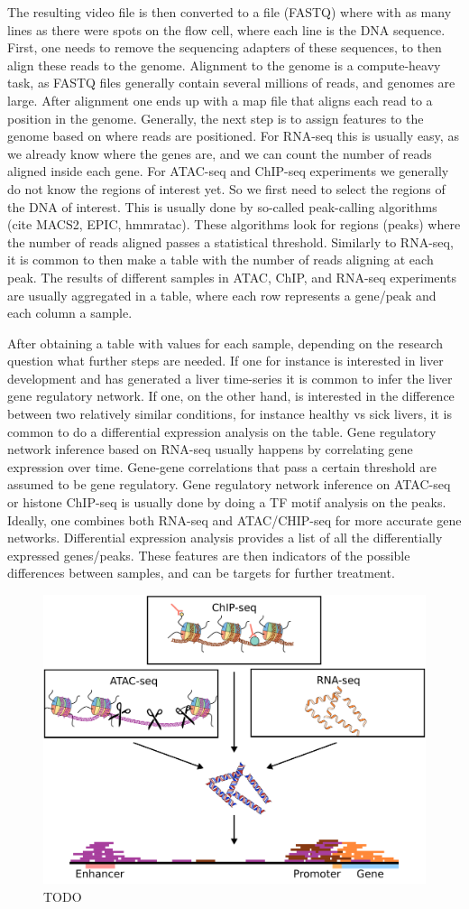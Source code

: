 The resulting video file is then converted to a file (FASTQ) where with as many lines as there were spots on the flow cell, where each line is the DNA sequence. First, one needs to remove the sequencing adapters of these sequences, to then align these reads to the genome. Alignment to the genome is a compute-heavy task, as FASTQ files generally contain several millions of reads, and genomes are large. After alignment one ends up with a map file that aligns each read to a position in the genome. Generally, the next step is to assign features to the genome based on where reads are positioned. For RNA-seq this is usually easy, as we already know where the genes are, and we can count the number of reads aligned inside each gene. For ATAC-seq and ChIP-seq experiments we generally do not know the regions of interest yet. So we first need to select the regions of the DNA of interest. This is usually done by so-called peak-calling algorithms (cite MACS2, EPIC, hmmratac). These algorithms look for regions (peaks) where the number of reads aligned passes a statistical threshold. Similarly to RNA-seq, it is common to then make a table with the number of reads aligning at each peak. The results of different samples in ATAC, ChIP, and RNA-seq experiments are usually aggregated in a table, where each row represents a gene/peak and each column a sample.

After obtaining a table with values for each sample, depending on the research question what further steps are needed. If one for instance is interested in liver development and has generated a liver time-series it is common to infer the liver gene regulatory network. If one, on the other hand, is interested in the difference between two relatively similar conditions, for instance healthy vs sick livers, it is common to do a differential expression analysis on the table. Gene regulatory network inference based on RNA-seq usually happens by correlating gene expression over time. Gene-gene correlations that pass a certain threshold are assumed to be gene regulatory. Gene regulatory network inference on ATAC-seq or histone ChIP-seq is usually done by doing a TF motif analysis on the peaks. Ideally, one combines both RNA-seq and ATAC/CHIP-seq for more accurate gene networks. Differential expression analysis provides a list of all the differentially expressed genes/peaks. These features are then indicators of the possible differences between samples, and can be targets for further treatment.

\begin{figure}
    \center
    \includegraphics[width=0.5\linewidth]{ch.introduction/imgs/analysis.png}
    \caption{TODO}
    \label{fig:analysis}
\end{figure}


